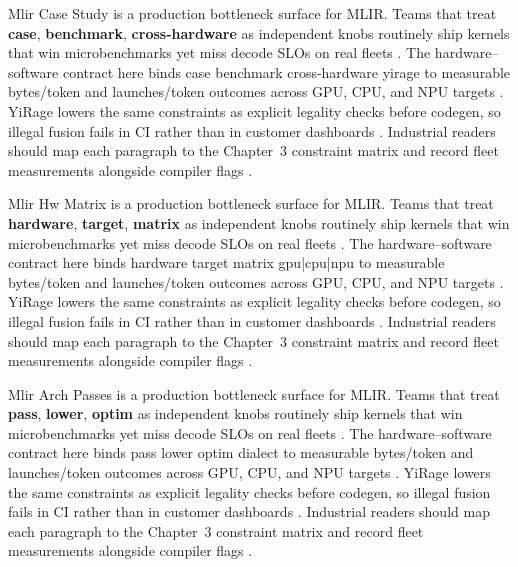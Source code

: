 Mlir Case Study is a production bottleneck surface for MLIR. Teams that treat \textbf{case}, \textbf{benchmark}, \textbf{cross-hardware} as independent knobs routinely ship kernels that win microbenchmarks yet miss decode SLOs on real fleets \citep{semianalysis2024tma,dlbook}. The hardware--software contract here binds case benchmark cross-hardware yirage to measurable bytes/token and launches/token outcomes across GPU, CPU, and NPU targets \citep{amd2024xdna,dao2022flashattention}. YiRage lowers the same constraints as explicit legality checks before codegen, so illegal fusion fails in CI rather than in customer dashboards \citep{amd2024aie,kwon2023vllm}. Industrial readers should map each paragraph to the Chapter~3 constraint matrix and record fleet measurements alongside compiler flags \citep{dlbook,nvidia2024cudagraphs}.

Mlir Hw Matrix is a production bottleneck surface for MLIR. Teams that treat \textbf{hardware}, \textbf{target}, \textbf{matrix} as independent knobs routinely ship kernels that win microbenchmarks yet miss decode SLOs on real fleets \citep{amd2024xdna,dao2022flashattention}. The hardware--software contract here binds hardware target matrix gpu|cpu|npu to measurable bytes/token and launches/token outcomes across GPU, CPU, and NPU targets \citep{amd2024aie,kwon2023vllm}. YiRage lowers the same constraints as explicit legality checks before codegen, so illegal fusion fails in CI rather than in customer dashboards \citep{dlbook,nvidia2024cudagraphs}. Industrial readers should map each paragraph to the Chapter~3 constraint matrix and record fleet measurements alongside compiler flags \citep{dao2022flashattention,liu2024deepseekv3}.

Mlir Arch Passes is a production bottleneck surface for MLIR. Teams that treat \textbf{pass}, \textbf{lower}, \textbf{optim} as independent knobs routinely ship kernels that win microbenchmarks yet miss decode SLOs on real fleets \citep{amd2024aie,kwon2023vllm}. The hardware--software contract here binds pass lower optim dialect to measurable bytes/token and launches/token outcomes across GPU, CPU, and NPU targets \citep{dlbook,nvidia2024cudagraphs}. YiRage lowers the same constraints as explicit legality checks before codegen, so illegal fusion fails in CI rather than in customer dashboards \citep{dao2022flashattention,liu2024deepseekv3}. Industrial readers should map each paragraph to the Chapter~3 constraint matrix and record fleet measurements alongside compiler flags \citep{kwon2023vllm,patel2025llminference}.

